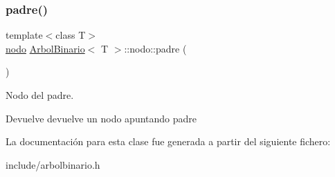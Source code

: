 \subsubsection{\texorpdfstring{padre()}{padre()}}
{\footnotesize\ttfamily template$<$class T$>$ \\
\hyperlink{classArbolBinario_1_1nodo}{nodo} \hyperlink{classArbolBinario}{Arbol\+Binario}$<$ T $>$\+::nodo\+::padre (\begin{DoxyParamCaption}{ }\end{DoxyParamCaption})\hspace{0.3cm}{\ttfamily [inline]}}



Nodo del padre. 

\begin{DoxyReturn}{Devuelve}
devuelve un nodo apuntando padre 
\end{DoxyReturn}


La documentación para esta clase fue generada a partir del siguiente fichero\+:\begin{DoxyCompactItemize}
\item 
include/arbolbinario.\+h\end{DoxyCompactItemize}
